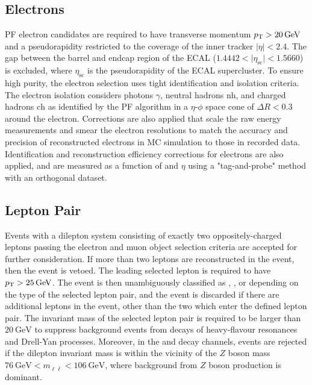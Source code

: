 \subsection{Electrons}
PF electron candidates are required to have transverse momentum $\pT > \SI{20}{\GeV}$ and a pseudorapidity restricted to the coverage of the inner tracker $\vert \eta \vert < 2.4$.
The gap between the barrel and endcap region of the ECAL ($1.4442 < \vert \eta_\mathrm{sc} \vert < 1.5660$) is excluded, where $\eta_\mathrm{sc}$ is the pseudorapidity of the ECAL supercluster.
To ensure high purity, the electron selection uses tight identification and isolation criteria.
The electron isolation considers photons $\gamma$, neutral hadrons $\mathrm{nh}$, and charged hadrons $\mathrm{ch}$ as identified by the PF algorithm in a $\eta$-$\phi$ space cone of $\Delta R < 0.3$ around the electron.
Corrections are also applied that scale the raw energy measurements and smear the electron resolutions to match the accuracy and precision of reconstructed electrons in MC simulation to those in recorded data.
Identification and reconstruction efficiency corrections for electrons are also applied, and are measured as a function of \pT and $\eta$ using a "tag-and-probe" method with an orthogonal dataset.

\subsection{Lepton Pair}
Events with a dilepton system consisting of exactly two oppositely-charged leptons passing the electron and muon object selection criteria are accepted for further consideration.
If more than two leptons are reconstructed in the event, then the event is vetoed.
The leading selected lepton is required to have $\pT > \SI{25}{\GeV}$.
The event is then unambiguously classified as \ee, \emu, or \mumu depending on the type of the selected lepton pair, and the event is discarded if there are additional leptons in the event, other than the two which enter the defined lepton pair.
The invariant mass of the selected lepton pair is required to be larger than $\SI{20}{\GeV}$ to suppress background events from decays of heavy-flavour resonances and Drell-Yan processes.
Moreover, in the \ee and \mumu decay channels, events are rejected if the dilepton invariant mass is within the vicinity of the $Z$ boson mass $\SI{76}{\GeV} < m_{\ell\bar{\ell}} < \SI{106}{\GeV}$, where background from $Z$ boson production is dominant.

